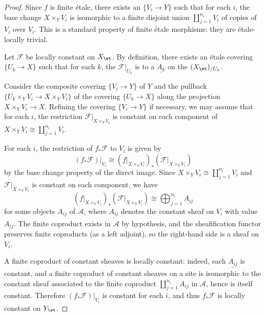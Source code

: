 \begin{proof}
Since $f$ is finite \'etale, there exists an  $\{V_i \to Y\}$ such that for each $i$, the base change $X \times_Y V_i$ is isomorphic to a finite disjoint union $\coprod_{j=1}^{n_i} V_i$ of copies of $V_i$ over $V_i$.  This is a standard property of finite \'etale morphisms: they are \'etale-locally trivial.

Let $\mathcal{F}$ be locally constant on $X_{\et}$. By definition, there exists an \'etale covering $\{U_k \to X\}$ such that for each $k$, the  $\mathcal{F}|_{U_k}$ is  to a  $\underline{A_k}$ on the  $(X_{\et})_{/U_k}$.

Consider the composite covering $\{V_i \to Y\}$ of $Y$ and the pullback $\{U_k \times_Y V_i \to X \times_Y V_i\}$ of the covering $\{U_k \to X\}$ along the projection $X \times_Y V_i \to X$. Refining the covering $\{V_i \to Y\}$ if necessary, we may assume that for each $i$, the restriction $\mathcal{F}|_{X \times_Y V_i}$ is constant on each component of $X \times_Y V_i \cong \coprod_{j=1}^{n_i} V_i$.

For each $i$, the restriction of $f_* \mathcal{F}$ to $V_i$ is given by
$$(f_* \mathcal{F})|_{V_i} \cong (f|_{X \times_Y V_i})_* (\mathcal{F}|_{X \times_Y V_i})$$
by the base change property of the direct image. Since $X \times_Y V_i \cong \coprod_{j=1}^{n_i} V_i$ and $\mathcal{F}|_{X \times_Y V_i}$ is constant on each component, we have
$$(f|_{X \times_Y V_i})_* (\mathcal{F}|_{X \times_Y V_i}) \cong \bigoplus_{j=1}^{n_i} \underline{A_{ij}}$$
for some objects $A_{ij}$ of $\mathcal{A}$, where $\underline{A_{ij}}$ denotes the constant sheaf on $V_i$ with value $A_{ij}$. The finite coproduct exists in $\mathcal{A}$ by hypothesis, and the sheafification functor preserves finite coproducts (as a left adjoint), so the right-hand side is a sheaf on $V_i$.

A finite coproduct of constant sheaves is locally constant: indeed, each $\underline{A_{ij}}$ is constant, and a finite coproduct of constant sheaves on a site is isomorphic to the constant sheaf associated to the finite coproduct $\coprod_{j=1}^{n_i} A_{ij}$ in $\mathcal{A}$, hence is itself constant. Therefore $(f_* \mathcal{F})|_{V_i}$ is constant for each $i$, and thus $f_* \mathcal{F}$ is locally constant on $Y_{\et}$.
\end{proof}